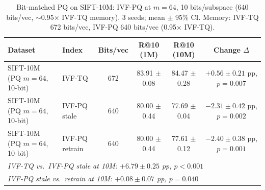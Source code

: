 \begin{table}[t]
\caption{Bit-matched PQ on SIFT-10M: IVF-PQ at $m{=}64$, 10 bits/subspace (640 bits/vec, $\sim$0.95$\times$ IVF-TQ memory). 3 seeds; mean $\pm$ 95\% CI. Memory: IVF-TQ 672 bits/vec, IVF-PQ 640 bits/vec (0.95$\times$ IVF-TQ).}
\label{tab:streaming_sift10m_pqmatched}
\centering\small
\begin{tabular}{llcccc}
\toprule
Dataset & Index & Bits/vec & R@10 (1M) & R@10 (10M) & Change $\Delta$ \\
\midrule
  SIFT-10M (PQ $m{=}64$, 10-bit) & IVF-TQ & 672 & 83.91 $\pm$ 0.08 & 84.47 $\pm$ 0.28 & $+0.56 \pm 0.21$ pp, $p=0.007$ \\
  SIFT-10M (PQ $m{=}64$, 10-bit) & IVF-PQ stale & 640 & 80.00 $\pm$ 0.44 & 77.69 $\pm$ 0.04 & $-2.31 \pm 0.42$ pp, $p=0.002$ \\
  SIFT-10M (PQ $m{=}64$, 10-bit) & IVF-PQ retrain & 640 & 80.00 $\pm$ 0.44 & 77.61 $\pm$ 0.12 & $-2.40 \pm 0.38$ pp, $p=0.001$ \\
\midrule
\multicolumn{6}{l}{\textit{IVF-TQ vs.\ IVF-PQ stale at 10M: $+6.79 \pm 0.25$ pp, $p<0.001$}} \\
\multicolumn{6}{l}{\textit{IVF-PQ stale vs.\ retrain at 10M: $+0.08 \pm 0.07$ pp, $p=0.040$}} \\
\bottomrule
\end{tabular}
\end{table}
